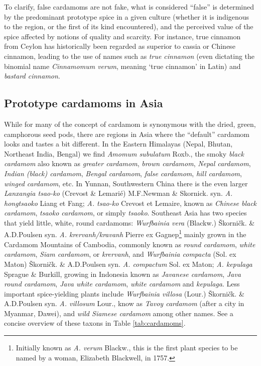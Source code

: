 \documentclass[12pt]{article}
\begin{document}
To clarify, false cardamoms are not fake, what is considered ``false'' is determined by the predominant prototype spice in a given culture (whether it is indigenous to the region, or the first of its kind encountered), and the perceived value of the spice affected by notions of quality and scarcity. For instance, true cinnamon from Ceylon has historically been regarded as superior to cassia or Chinese cinnamon, leading to the use of names such as \textit{true cinnamon} (even dictating the binomial name \textit{Cinnamomum verum}, meaning `true cinnamon' in Latin) and \textit{bastard cinnamon}.

\subsection{Prototype cardamoms in Asia}

While for many of the concept of cardamom is synonymous with the dried, green, camphorous seed pods, there are regions in Asia where the ``default'' cardamom looks and tastes a bit different. In the Eastern Himalayas (Nepal, Bhutan, Northeast India, Bengal) we find \textit{Amomum subulatum} Roxb., the smoky \textit{black cardamom} also known as  \textit{greater cardamom}, \textit{brown cardamom}, \textit{Nepal cardamom}, \textit{Indian (black) cardamom}, \textit{Bengal cardamom}, \textit{false cardamom}, \textit{hill cardamom}, \textit{winged cardamom}, etc. In Yunnan, Southwestern China there is the even larger \textit{Lanxangia tsao-ko} (Crevost \& Lemarié) M.F.Newman \& Skornick. syn. \textit{A. hongtsaoko} Liang et Fang; \textit{A. tsao-ko} Crevost et Lemaire, known as \textit{Chinese black cardamom}, \textit{tsaoko cardamom}, or simply \textit{tsaoko}. Southeast Asia has two species that yield little, white, round cardamoms: \textit{Wurfbainia vera} (Blackw.) Škorničk. \& A.D.Poulsen syn. \textit{A. krervanh/kravanh} Pierre ex Gagnep\footnote{Initially known as \textit{A. verum} Blackw., this is the first plant species to be named by a woman, Elizabeth Blackwell, in 1757.} mainly grown in the Cardamom Mountains of Cambodia, commonly known as \textit{round cardamom}, \textit{white cardamom}, \textit{Siam cardamom}, or \textit{krervanh}, and \textit{Wurfbainia compacta} (Sol. ex Maton) Škorničk. \& A.D.Poulsen syn. \textit{A. compactum} Sol. ex Maton; \textit{A. kepulaga} Sprague \& Burkill, growing in Indonesia known as \textit{Javanese cardamom}, \textit{Java round cardamom}, \textit{Java white cardamom}, \textit{white cardamom} and \textit{kepulaga}. Less important spice-yielding plants include \textit{Wurfbainia villosa} (Lour.) Škorničk. \& A.D.Poulsen syn. \textit{A. villosum} Lour., know as \textit{Tavoy cardamom} (after a city in Myanmar, Dawei), and \textit{wild Siamese cardamom} among other names. See a concise overview of these taxons in Table \ref{tab:cardamoms}. 
\end{document}

